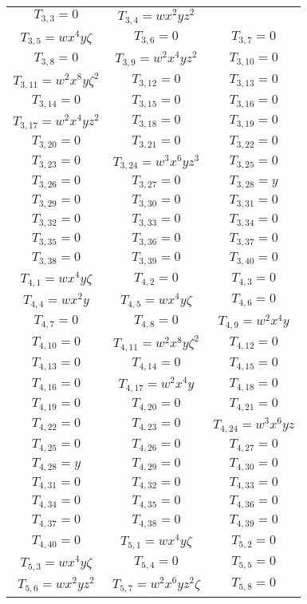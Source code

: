 \begin{longtable}{|c|c|c|}
$T_{3,3}= 0$&
$T_{3,4}= wx^2yz^2$\\
$T_{3,5}= wx^4y\zeta$&
$T_{3,6}= 0$&
$T_{3,7}= 0$\\
$T_{3,8}= 0$&
$T_{3,9}= w^2x^4yz^2$&
$T_{3,10}= 0$\\
$T_{3,11}= w^2x^8y\zeta^2$&
$T_{3,12}= 0$&
$T_{3,13}= 0$\\
$T_{3,14}= 0$&
$T_{3,15}= 0$&
$T_{3,16}= 0$\\
$T_{3,17}= w^2x^4yz^2$&
$T_{3,18}= 0$&
$T_{3,19}= 0$\\
$T_{3,20}= 0$&
$T_{3,21}= 0$&
$T_{3,22}= 0$\\
$T_{3,23}= 0$&
$T_{3,24}= w^3x^6yz^3$&
$T_{3,25}= 0$\\
$T_{3,26}= 0$&
$T_{3,27}= 0$&
$T_{3,28}= y$\\
$T_{3,29}= 0$&
$T_{3,30}= 0$&
$T_{3,31}= 0$\\
$T_{3,32}= 0$&
$T_{3,33}= 0$&
$T_{3,34}= 0$\\
$T_{3,35}= 0$&
$T_{3,36}= 0$&
$T_{3,37}= 0$\\
$T_{3,38}= 0$&
$T_{3,39}= 0$&
$T_{3,40}= 0$\\
$T_{4,1}= wx^4y\zeta$&
$T_{4,2}= 0$&
$T_{4,3}= 0$\\
$T_{4,4}= wx^2y$&
$T_{4,5}= wx^4y\zeta$&
$T_{4,6}= 0$\\
$T_{4,7}= 0$&
$T_{4,8}= 0$&
$T_{4,9}= w^2x^4y$\\
$T_{4,10}= 0$&
$T_{4,11}= w^2x^8y\zeta^2$&
$T_{4,12}= 0$\\
$T_{4,13}= 0$&
$T_{4,14}= 0$&
$T_{4,15}= 0$\\
$T_{4,16}= 0$&
$T_{4,17}= w^2x^4y$&
$T_{4,18}= 0$\\
$T_{4,19}= 0$&
$T_{4,20}= 0$&
$T_{4,21}= 0$\\
$T_{4,22}= 0$&
$T_{4,23}= 0$&
$T_{4,24}= w^3x^6yz$\\
$T_{4,25}= 0$&
$T_{4,26}= 0$&
$T_{4,27}= 0$\\
$T_{4,28}= y$&
$T_{4,29}= 0$&
$T_{4,30}= 0$\\
$T_{4,31}= 0$&
$T_{4,32}= 0$&
$T_{4,33}= 0$\\
$T_{4,34}= 0$&
$T_{4,35}= 0$&
$T_{4,36}= 0$\\
$T_{4,37}= 0$&
$T_{4,38}= 0$&
$T_{4,39}= 0$\\
$T_{4,40}= 0$&
$T_{5,1}= wx^4y\zeta$&
$T_{5,2}= 0$\\
$T_{5,3}= wx^4y\zeta$&
$T_{5,4}= 0$&
$T_{5,5}= 0$\\
$T_{5,6}= wx^2yz^2$&
$T_{5,7}= w^2x^6yz^2\zeta$&
$T_{5,8}= 0$\\

\end{longtable}
